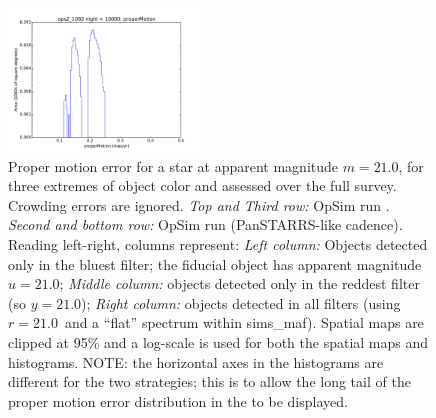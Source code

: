 \begin{figure}[ht]
\begin{center}
  \includegraphics[width=2.0in]{./figs/milkyway/MW_Astrom_pmError_1092_10y_hst.pdf}
  \end{center}
  \caption{Proper motion error for a star at apparent magnitude $m=21.0$, for three extremes of object color and assessed over the full survey. Crowding errors are ignored. {\it Top and Third row:} OpSim run . {\it Second and bottom row:} OpSim run  (PanSTARRS-like cadence). Reading left-right, columns represent: {\it Left column:} Objects detected only in the bluest filter; the fiducial object has apparent magnitude $u=21.0$; {\it Middle column:} objects detected only in the reddest filter (so $y = 21.0$); {\it Right column:} objects detected in all filters (using $r=21.0$~and a ``flat'' spectrum within sims\_maf). Spatial maps are clipped at 95\% and a log-scale is used for both the spatial maps and histograms. NOTE: the horizontal axes in the histograms are different for the two strategies; this is to allow the long tail of the proper motion error distribution in the  to be displayed.}
  \label{fig_astrom_ByFilter_pmError}
\end{figure}

